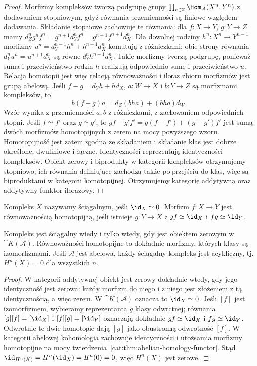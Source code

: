 \begin{proof}
Morfizmy kompleksów tworzą podgrupę grupy $\prod_{n\in\mathbb Z}\Hom_{\mathcal A}(X^n,Y^n)$ z dodawaniem stopniowym, gdyż równania przemienności są liniowe względem dodawania. Składanie stopniowe zachowuje te równania: dla $f:X\to Y$, $g:Y\to Z$ mamy $d_Z^ng^nf^n=g^{n+1}d_Y^nf^n=g^{n+1}f^{n+1}d_X^n$. Dla dowolnej rodziny $h^n:X^n\to Y^{n-1}$ morfizmy $u^n=d_Y^{n-1}h^n+h^{n+1}d_X^n$ komutują z różniczkami: obie strony równania $d_Y^nu^n=u^{n+1}d_X^n$ są równe $d_Y^nh^{n+1}d_X^n$. Takie morfizmy tworzą podgrupę, ponieważ suma i przeciwieństwo rodzin $h$ realizują odpowiednio sumę i przeciwieństwo $u$. Relacja homotopii jest więc relacją równoważności i iloraz zbioru morfizmów jest grupą abelową.
Jeśli $f-g=d_Yh+hd_X$, $a:W\to X$ i $b:Y\to Z$ są morfizmami kompleksów, to
\[
 b(f-g)a=d_Z(bha)+(bha)d_W.
\]
Wzór wynika z przemienności $a,b$ z różniczkami, z zachowaniem odpowiednich stopni. Jeśli $f\simeq f'$ oraz $g\simeq g'$, to $gf-g'f'=g(f-f')+(g-g')f'$ jest sumą dwóch morfizmów homotopijnych z zerem na mocy powyższego wzoru. Homotopijność jest zatem zgodna ze składaniem i składanie klas jest dobrze określone, dwuliniowe i łączne. Identyczności reprezentują identyczności kompleksów. Obiekt zerowy i biprodukty w kategorii kompleksów otrzymujemy stopniowo; ich równania definiujące zachodzą także po przejściu do klas, więc są biproduktami w kategorii homotopijnej. Otrzymujemy kategorię addytywną oraz addytywny funktor ilorazowy.
\end{proof}
\begin{definicja}\label{cat:def:contractible-complex}
Kompleks $X$ nazywamy ściągalnym, jeśli $\id_X\simeq0$. Morfizm $f:X\to Y$ jest równoważnością homotopijną, jeśli istnieje $g:Y\to X$ z $gf\simeq\id_X$ i $fg\simeq\id_Y$.
\end{definicja}
\begin{stwierdzenie}\label{cat:prop:contractible-zero}
Kompleks jest ściągalny wtedy i tylko wtedy, gdy jest obiektem zerowym w $\cat{K}(\mathcal A)$. Równoważności homotopijne to dokładnie morfizmy, których klasy są izomorfizmami. Jeśli $\mathcal A$ jest abelowa, każdy ściągalny kompleks jest acykliczny, tj. $H^n(X)=0$ dla wszystkich $n$.
\end{stwierdzenie}
\begin{proof}
W kategorii addytywnej obiekt jest zerowy dokładnie wtedy, gdy jego identyczność jest zerowa: każdy morfizm do niego i z niego jest złożeniem z tą identycznością, a więc zerem. W $\cat{K}(\mathcal A)$ oznacza to $\id_X\simeq0$. Jeśli $[f]$ jest izomorfizmem, wybieramy reprezentanta $g$ klasy odwrotnej; równania $[g][f]=[\id_X]$ i $[f][g]=[\id_Y]$ oznaczają dokładnie $gf\simeq\id_X$ i $fg\simeq\id_Y$. Odwrotnie te dwie homotopie dają $[g]$ jako obustronną odwrotność $[f]$. W kategorii abelowej kohomologia zachowuje identyczności i utożsamia morfizmy homotopijne na mocy twierdzenia~\ref{cat:thm:abelian-homology-functor}. Stąd $\id_{H^n(X)}=H^n(\id_X)=H^n(0)=0$, więc $H^n(X)$ jest zerowe.
\end{proof}
